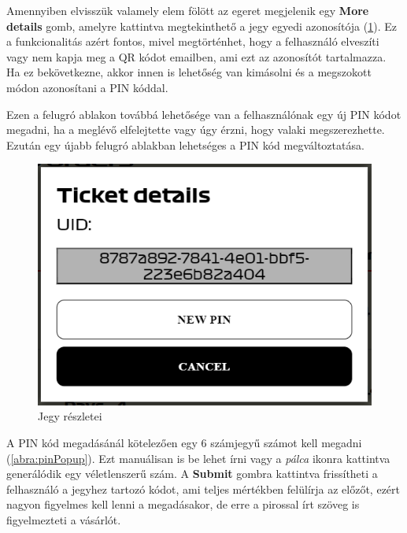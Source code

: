 Amennyiben elvisszük valamely elem fölött az egeret megjelenik egy \textbf{More details} gomb, amelyre kattintva megtekinthető a jegy egyedi azonosítója (\ref{abra:moreDetails}). Ez a funkcionalitás azért fontos, mivel megtörténhet, hogy a felhasználó elveszíti vagy nem kapja meg a QR kódot emailben, ami ezt az azonosítót tartalmazza. Ha ez bekövetkezne, akkor innen is lehetőség van kimásolni és a megszokott módon azonosítani a PIN kóddal.

Ezen a felugró ablakon továbbá lehetősége van a felhasználónak egy új PIN kódot megadni, ha a meglévő elfelejtette vagy úgy érzni, hogy valaki megszerezhette. Ezután egy újabb felugró ablakban lehetséges a PIN kód megváltoztatása. 

\begin{figure}[!h]
	\centering
	\includegraphics[scale=0.4]{images/moreDetails}
	\caption{Jegy részletei}
	\label{abra:moreDetails}
\end{figure}

A PIN kód megadásánál kötelezően egy 6 számjegyű számot kell megadni (\ref{abra:pinPopup}). Ezt manuálisan is be lehet írni vagy a \textit{pálca} ikonra kattintva generálódik egy véletlenszerű szám. A \textbf{Submit} gombra kattintva frissítheti a felhasználó a jegyhez tartozó kódot, ami teljes mértékben felülírja az előzőt, ezért nagyon figyelmes kell lenni a megadásakor, de erre a pirossal írt szöveg is figyelmezteti a vásárlót.

